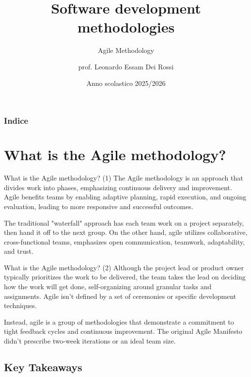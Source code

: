 \documentclass[
    notheorems,
    11pt,
    compress,
    aspectratio=169
]{beamer}
\title[Agile Methodology]{Software development methodologies}
\subtitle{Agile Methodology}
\author{prof. Leonardo Essam Dei Rossi}
\institute[]{ITT "M. Buonarroti" - Trento (TN)}
\date[A.S. 2025/2026]{Anno scolastico 2025/2026}
\begin{document}
\setlength{\baselineskip}{15pt}

\begin{frame}
\titlepage
\end{frame}

\begin{frame}
    \frametitle{Indice}

    \tableofcontents
\end{frame}


\section{What is the Agile methodology?}

\begin{frame}{What is the Agile methodology? (1)}
    The Agile methodology is an approach that divides work into phases, emphasizing continuous delivery and improvement. Agile benefits teams by enabling adaptive planning, rapid execution, and ongoing evaluation, leading to more responsive and successful outcomes.

    \pause
    \vspace{0.5cm}

    The traditional "waterfall" approach has each team work on a project separately, then hand it off to the next group. On the other hand, agile utilizes collaborative, cross-functional teams, emphasizes open communication, teamwork, adaptability, and trust.
\end{frame}

\begin{frame}{What is the Agile methodology? (2)}
    Although the project lead or product owner typically prioritizes the work to be delivered, the team takes the lead on deciding how the work will get done, self-organizing around granular tasks and assignments. Agile isn't defined by a set of ceremonies or specific development techniques.

    \pause
    \vspace{0.5cm}

    Instead, agile is a group of methodologies that demonstrate a commitment to tight feedback cycles and continuous improvement. The original Agile Manifesto didn't prescribe two-week iterations or an ideal team size.
\end{frame}


\subsection{Key Takeaways}
\end{document}
